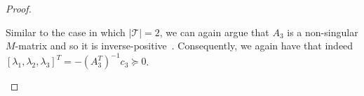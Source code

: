\begin{proof}
\begin{enumerate}
	Similar to the case in which $|\mathcal{T}| = 2$, we can again argue that $A_{3}$ is a non-singular $M$-matrix and so it is inverse-positive~\cite{P77}.  Consequently, we again have that indeed $[\lambda_1, \lambda_2, \lambda_3]^T = -(A_3^{T})^{-1} c_3 \succeq 0$.
	
%
\end{enumerate}



\end{proof}

